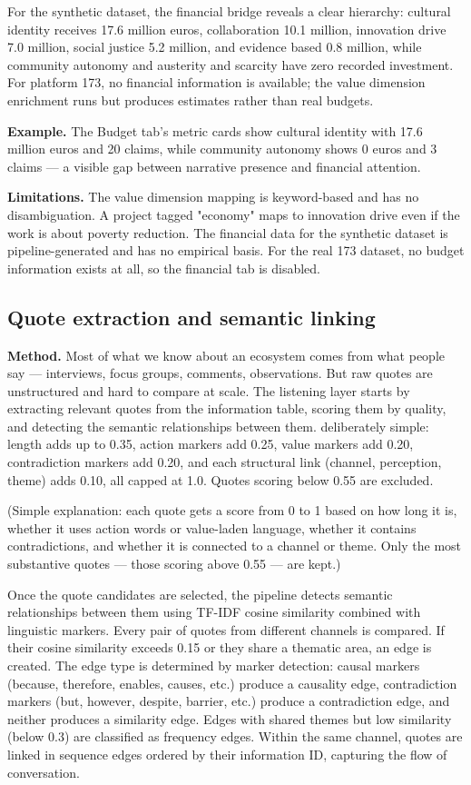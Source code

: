 \documentclass[11pt,a4paper]{article}
\begin{document}
For the synthetic dataset, the financial bridge reveals a clear
hierarchy: cultural identity receives 17.6 million euros, collaboration
10.1 million, innovation drive 7.0 million, social justice 5.2 million,
and evidence based 0.8 million, while community autonomy and austerity
and scarcity have zero recorded investment. For platform 173, no
financial information is available; the value dimension enrichment runs
but produces estimates rather than real budgets.

\textbf{Example.} The Budget tab's metric cards show cultural identity with
17.6 million euros and 20 claims, while community autonomy shows 0 euros
and 3 claims — a visible gap between narrative presence and financial
attention.

\textbf{Limitations.} The value dimension mapping is keyword-based and has no
disambiguation. A project tagged "economy" maps to innovation drive even
if the work is about poverty reduction. The financial data for the
synthetic dataset is pipeline-generated and has no empirical basis. For
the real 173 dataset, no budget information exists at all, so the
financial tab is disabled.

\subsection{Quote extraction and semantic linking}

\textbf{Method.} Most of what we know about an ecosystem comes from what
people say — interviews, focus groups, comments, observations. But raw
quotes are unstructured and hard to compare at scale. The listening layer
starts by extracting relevant quotes from the information table, scoring
them by quality, and detecting the semantic relationships between them. deliberately simple: length adds up to 0.35, action markers
add 0.25, value markers add 0.20, contradiction markers add 0.20, and
each structural link (channel, perception, theme) adds 0.10, all capped
at 1.0. Quotes scoring below 0.55 are excluded.

(Simple explanation: each quote gets a score from 0 to 1 based on how
long it is, whether it uses action words or value-laden language,
whether it contains contradictions, and whether it is connected to a
channel or theme. Only the most substantive quotes — those scoring above
0.55 — are kept.)

Once the quote candidates are selected, the pipeline detects semantic
relationships between them using TF-IDF cosine similarity combined with
linguistic markers. Every pair of quotes from different channels is
compared. If their cosine similarity exceeds 0.15 or they share a
thematic area, an edge is created. The edge type is determined by marker
detection: causal markers (because, therefore, enables, causes, etc.)
produce a causality edge, contradiction markers (but, however, despite,
barrier, etc.) produce a contradiction edge, and neither produces a
similarity edge. Edges with shared themes but low similarity (below 0.3)
are classified as frequency edges. Within the same channel, quotes are
linked in sequence edges ordered by their information ID, capturing the
flow of conversation.
\end{document}
